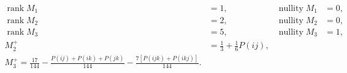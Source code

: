 \begin{align}
\operatorname{rank} M_1 &= 1, & \operatorname{nullity} M_1 &= 0, \\
\operatorname{rank} M_2 &= 2, & \operatorname{nullity} M_2 &= 0, \\
\operatorname{rank} M_3 &= 5, & \operatorname{nullity} M_3 &= 1, \\
M_2^+ &= \frac13 + \frac16 P(ij), \\
M_3^+ = \frac{17}{144}-\frac{P(ij)+P(ik)+P(jk)}{144}-\frac{7[P(ijk)+P(ikj)]}{144}.
\end{align}
